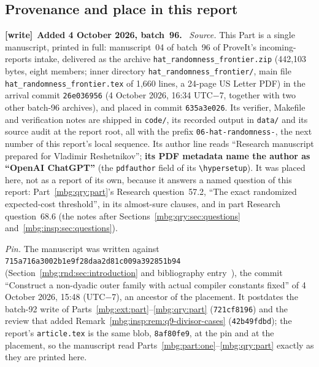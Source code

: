 \documentclass[11pt,letterpaper]{article}
\theoremstyle{definition}
\newenvironment{writenote}[1][]{\par\smallskip\begingroup\small
 \noindent\textbf{[write]}\if\relax\detokenize{#1}\relax\else~\textbf{#1.}\fi\ }%
 {\par\endgroup\smallskip}
\begin{document}
\subsection{Provenance and place in this report}
\label{mbg:rnd:sec:place}

\begin{writenote}[Added 4 October 2026, batch~96]
\emph{Source.} This Part is a single manuscript, printed in full: manuscript~04 of batch~96 of ProveIt's incoming-reports intake, delivered as the archive \texttt{hat\_\allowbreak randomness\_\allowbreak frontier.zip} (442,103 bytes, eight members; inner directory \texttt{hat\_\allowbreak randomness\_\allowbreak frontier/}, main file \texttt{hat\_\allowbreak randomness\_\allowbreak frontier.tex} of 1,660 lines, a 24-page US Letter PDF) in the arrival commit \texttt{26e036956} (4 October 2026, 16:34 UTC$-$7, together with two other batch-96 archives), and placed in commit \texttt{635a3e026}. Its verifier, Makefile and verification notes are shipped in \texttt{code/}, its recorded output in \texttt{data/} and its source audit at the report root, all with the prefix \texttt{06-hat-randomness-}, the next number of this report's local sequence. Its author line reads ``Research manuscript prepared for Vladimir Reshetnikov''; \textbf{its PDF metadata name the author as ``OpenAI ChatGPT''} (the \texttt{pdfauthor} field of its \texttt{\textbackslash hypersetup}). It was placed here, not as a report of its own, because it answers a named question of this report: Part~\ref{mbg:qry:part}'s Research question~57.2, ``The exact randomized expected-cost threshold'', in its almost-sure clauses, and in part Research question~68.6 (the notes after Sections~\ref{mbg:qry:sec:questions} and~\ref{mbg:insp:sec:questions}).

\emph{Pin.} The manuscript was written against \texttt{715a716a3002b1e9f28daa2d81c009a392851b94} (Section~\ref{mbg:rnd:sec:introduction} and bibliography entry~\cite{rnd:ProveIt}), the commit ``Construct a non-dyadic outer family with actual compiler constants fixed'' of 4 October 2026, 15:48 (UTC$-$7), an ancestor of the placement. It postdates the batch-92 write of Parts~\ref{mbg:ext:part}--\ref{mbg:qry:part} (\texttt{721cf8196}) and the review that added Remark~\ref{mbg:insp:rem:q9-divisor-cases} (\texttt{42b49fdbd}); the report's \texttt{article.tex} is the same blob, \texttt{8af80fe9}, at the pin and at the placement, so the manuscript read Parts~\ref{mbg:part:one}--\ref{mbg:qry:part} exactly as they are printed here.


\end{writenote}
\end{document}
